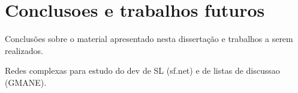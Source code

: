 \chapter{Conclusoes e trabalhos futuros} %
\label{cap:intro}

Conclusões sobre o material apresentado nesta dissertação e trabalhos a serem realizados.

Redes complexas para estudo do dev de SL (sf.net) e de listas de discussao (GMANE).